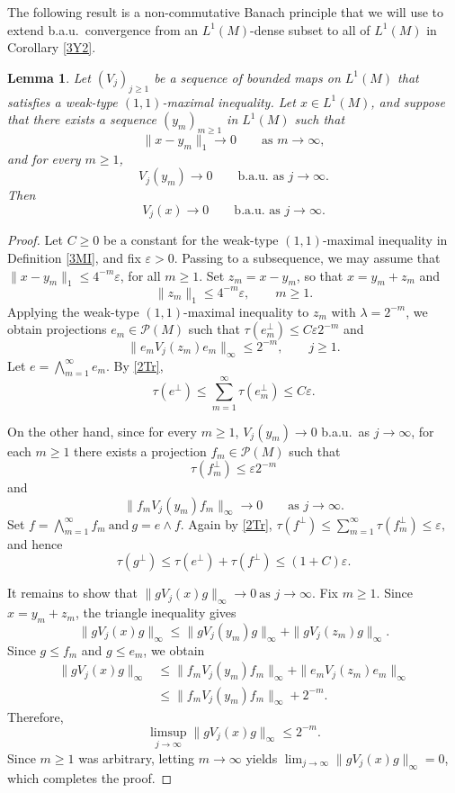 \documentclass[12pt]{amsart}
\renewcommand{\P}{\mbox{${\mathcal P}$}}
\newtheorem{lemma}[theorem]{Lemma}
\theoremstyle{remark}
\theoremstyle{definition}
\numberwithin{equation}{section}
\begin{document}
The following result is a non-commutative Banach principle that we will use to extend b.a.u.\ convergence from an $L^1(M)$-dense subset to all of $L^1(M)$ in Corollary \ref{3Y2}.
\begin{lemma}\label{3Y1}
Let $(V_j)_{j\geq1}$ be a sequence of bounded maps on $L^1(M)$ that
satisfies a weak-type $(1,1)$-maximal inequality. Let $x\in L^1(M)$,
and suppose that there exists a sequence $(y_m)_{m\geq1}$ in $L^1(M)$
such that
\[
\|x-y_m\|_1\longrightarrow0
\qquad\text{as }m\to\infty,
\]
and for every $m\geq1$,
\[
V_j(y_m)\longrightarrow0
\qquad\text{b.a.u.\ as }j\to\infty.
\]
Then
\[
V_j(x)\longrightarrow0
\qquad\text{b.a.u.\ as }j\to\infty.
\]
\end{lemma}

\begin{proof}
Let $C\geq0$ be a constant for the weak-type $(1,1)$-maximal inequality in Definition \ref{3MI}, and fix $\varepsilon>0$. Passing to a subsequence, 
we may assume that
$\|x-y_m\|_1\leq4^{-m}\varepsilon$,
for all $m\geq1$.
Set $z_m=x-y_m$, so that $x=y_m+z_m$ and
\[
\|z_m\|_1\leq4^{-m}\varepsilon,
\qquad m\geq1.
\]
Applying the weak-type $(1,1)$-maximal inequality to $z_m$ with $\lambda=2^{-m}$, we obtain projections $e_m\in\P(M)$ such that
\(\tau(e_m^\perp)\leq C\varepsilon 2^{-m}\)
and
\[
\|e_mV_j(z_m)e_m\|_\infty\leq2^{-m},
\qquad j\geq1.
\]
Let
\(e=\bigwedge_{m=1}^\infty e_m.
\)
By \eqref{2Tr},
\[
\tau(e^\perp)
\leq\sum_{m=1}^\infty\tau(e_m^\perp)
\leq C\varepsilon.
\]

On the other hand, since for every $m\geq1$, $V_j(y_m)\to0$ b.a.u.\ as $j\to\infty$, for each $m\geq1$ there exists a projection $f_m\in\P(M)$ such that
\[
\tau(f_m^\perp)\leq\varepsilon2^{-m}
\]
and
\[
\|f_mV_j(y_m)f_m\|_\infty\longrightarrow0
\qquad\text{as }j\to\infty.
\]
Set
\(f=\bigwedge_{m=1}^\infty f_m
\ \text{and}\
g=e\wedge f.\)
Again by \eqref{2Tr},
\(\tau(f^\perp)
\leq\sum_{m=1}^\infty\tau(f_m^\perp)
\leq\varepsilon, \)
and hence
\[
\tau(g^\perp)
\leq\tau(e^\perp)+\tau(f^\perp)
\leq(1+C)\varepsilon.
\]

It remains to show that
\(\|gV_j(x)g\|_\infty\longrightarrow0
\ \text{as }j\to\infty.\)
Fix $m\geq1$. Since $x=y_m+z_m$, the triangle inequality gives
\[
\|gV_j(x)g\|_\infty
\leq
\|gV_j(y_m)g\|_\infty
+
\|gV_j(z_m)g\|_\infty.
\]
Since $g\leq f_m$ and $g\leq e_m$, we obtain
\[
\begin{aligned}
\|gV_j(x)g\|_\infty
&\leq
\|f_mV_j(y_m)f_m\|_\infty
+
\|e_mV_j(z_m)e_m\|_\infty\\
&\leq
\|f_mV_j(y_m)f_m\|_\infty+2^{-m}.
\end{aligned}
\]
Therefore,
\[
\limsup_{j\to\infty}\|gV_j(x)g\|_\infty
\leq2^{-m}.
\]
Since $m\geq1$ was arbitrary, letting $m\to\infty$ yields \(\lim_{j\to\infty}\|gV_j(x)g\|_\infty = 0\), which completes the proof.
\end{proof}
\end{document}

